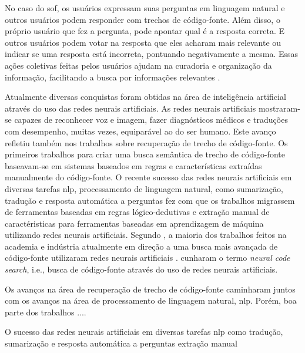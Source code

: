 No caso do \Gls{sof}, os usuários expressam suas perguntas em linguagem natural e outros usuários podem responder com trechos de código-fonte. Além disso, o próprio usuário que fez a pergunta, pode apontar qual é a resposta correta. E outros usuários podem votar na resposta que eles acharam mais relevante ou indicar se uma resposta está incorreta, pontuando negativamente a mesma. Essas ações coletivas feitas pelos usuários ajudam na curadoria e organização da informação, facilitando a busca por informações relevantes \citep{Wang-quora:2013, cambronero-deep-learning-code-search:2019}. 

Atualmente diversas conquistas foram obtidas na área de inteligência artificial através do uso das redes neurais artificiais. As redes neurais artificiais mostraram-se capazes de reconhecer voz e imagem, fazer diagnósticos médicos e traduções com desempenho, muitas vezes, equiparável ao do ser humano. Este avanço refletiu também nos trabalhos sobre recuperação de trecho de código-fonte. Os primeiros trabalhos para criar uma busca semântica de trecho de código-fonte baseavam-se em sistemas baseados em regras e características extraídas manualmente do código-fonte. O recente sucesso das redes neurais artificiais em diversas tarefas \acrfull{nlp}, processamento de linguagem natural, como sumarização, tradução e resposta automática a perguntas fez com que os trabalhos migrassem de ferramentas baseadas em regras lógico-dedutivas e extração manual de caractéristicas para ferramentas baseadas em aprendizagem de máquina utilizando redes neurais artificiais. Segundo \cite{cambronero-deep-learning-code-search:2019}, a maioria dos trabalhos feitos na academia e indústria atualmente em direção a uma busca mais avançada de código-fonte utilizaram redes neurais artificiais \citep{Gu-deep-code-search:2018, yao-2018, iyer-etal-2016-summarizing, Allamanis-bimodal-source-code-natural-language:2015, Chen-bi-variational-autoencoder:2018, Sachdev-neural-code-search:2018, cambronero-deep-learning-code-search:2019}. \cite{cambronero-deep-learning-code-search:2019} cunharam o termo \textit{neural code search}, i.e., busca de código-fonte através do uso de redes neurais artificiais.



Os avanços na área de recuperação de trecho de código-fonte caminharam juntos com os avanços na área de processamento de linguagem natural, \acrfull{nlp}. Porém, boa parte dos trabalhos ....


O sucesso das redes neurais artificiais em diversas tarefas \acrshort{nlp} como tradução, sumarização e resposta automática a perguntas  extração manual 



